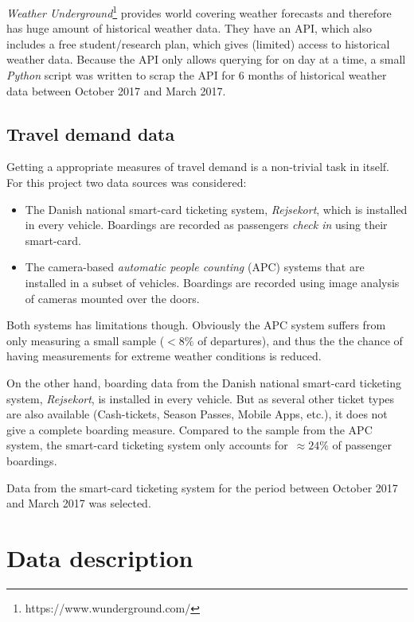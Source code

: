 \documentclass[a4paper,11pt]{article}
\begin{document}
\emph{Weather Underground}\footnote{https://www.wunderground.com/} provides world covering weather forecasts and therefore has huge amount of historical weather data. They have an API, which also includes a free student/research plan, which gives (limited) access to historical weather data. Because the API only allows querying for on day at a time, a small \emph{Python} script was written to scrap the API for 6 months of historical weather data between October 2017 and March 2017.

\subsection{Travel demand data}\label{ch:data_traveldemand}
Getting a appropriate measures of travel demand is a non-trivial task in itself. For this project two data sources was considered:
\begin{itemize}
    \item The Danish national smart-card ticketing system, \emph{Rejsekort}, which is installed in every vehicle. Boardings are recorded as passengers \emph{check in} using their smart-card.
    \item The camera-based \emph{automatic people counting} (APC) systems that are installed in a subset of vehicles. Boardings are recorded using image analysis of cameras mounted over the doors.
\end{itemize}

Both systems has limitations though. Obviously the APC system suffers from only measuring a small sample ($<8\%$ of departures), and thus the the chance of having measurements for extreme weather conditions is reduced.

On the other hand, boarding data from the Danish national smart-card ticketing system, \emph{Rejsekort}, is installed in every vehicle. But as several other ticket types are also available (Cash-tickets, Season Passes, Mobile Apps, etc.), it does not give a complete boarding measure. Compared to the sample from the APC system, the smart-card ticketing system only accounts for~$\approx 24\%$ of passenger boardings.


Data from the smart-card ticketing system for the period between October 2017 and March 2017 was selected.

\section{Data description}\label{ch:desc}
\end{document}
